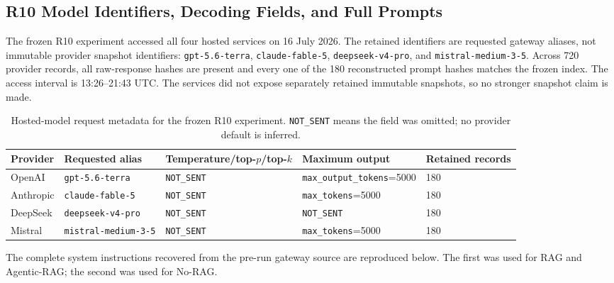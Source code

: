 \documentclass[journal]{IEEEtran}
\begin{document}
\subsection{R10 Model Identifiers, Decoding Fields, and Full Prompts}
The frozen R10 experiment accessed all four hosted services on 16 July 2026.
The retained identifiers are requested gateway aliases, not immutable provider
snapshot identifiers: \texttt{gpt-5.6-terra},
\texttt{claude-fable-5}, \texttt{deepseek-v4-pro}, and
\texttt{mistral-medium-3-5}. Across 720 provider records, all raw-response
hashes are present and every one of the 180 reconstructed prompt hashes matches
the frozen index. The access interval is 13:26--21:43 UTC. The services did
not expose separately retained immutable snapshots, so no stronger snapshot
claim is made.

\begin{table}[!t]
\centering
\caption{Hosted-model request metadata for the frozen R10 experiment.
\texttt{NOT\_SENT} means the field was omitted; no provider default is
inferred.}
\label{tab:r10-model-metadata}
\begin{adjustbox}{width=\textwidth}
\begin{tabular}{L{3.3cm}L{4.0cm}L{3.0cm}L{3.0cm}L{3.2cm}}
\toprule
Provider & Requested alias & Temperature/top-$p$/top-$k$ & Maximum output &
Retained records \\
\midrule
OpenAI & \texttt{gpt-5.6-terra} & \texttt{NOT\_SENT} &
\texttt{max\_output\_}\newline\texttt{tokens}=5000 & 180 \\
Anthropic & \texttt{claude-fable-5} & \texttt{NOT\_SENT} &
\texttt{max\_tokens}=5000 & 180 \\
DeepSeek & \texttt{deepseek-v4-pro} & \texttt{NOT\_SENT} &
\texttt{NOT\_SENT} & 180 \\
Mistral & \texttt{mistral-medium-3-5} & \texttt{NOT\_SENT} &
\texttt{max\_tokens}=5000 & 180 \\
\bottomrule
\end{tabular}
\end{adjustbox}
\end{table}

The complete system instructions recovered from the pre-run gateway source
are reproduced below. The first was used for RAG and Agentic-RAG; the second
was used for No-RAG.
\end{document}
